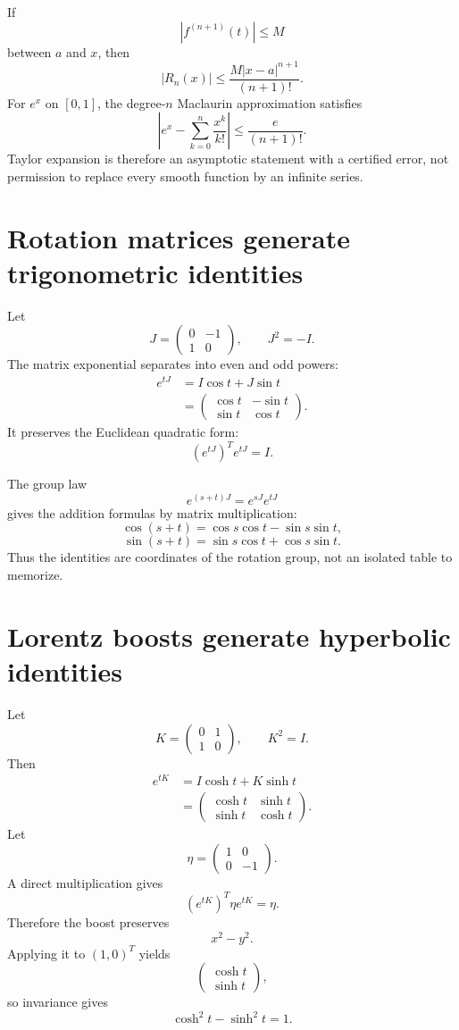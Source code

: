 If
\[
  |f^{(n+1)}(t)|\le M
\]
between \(a\) and \(x\), then
\[
  |R_n(x)|
  \le\frac{M|x-a|^{n+1}}{(n+1)!}.
\]
For \(e^x\) on \([0,1]\), the degree-\(n\) Maclaurin approximation satisfies
\[
  \left|
  e^x-\sum_{k=0}^n\frac{x^k}{k!}
  \right|
  \le\frac{e}{(n+1)!}.
\]
Taylor expansion is therefore an asymptotic statement with a certified error, not permission to replace every smooth function by an infinite series.

\section{Rotation matrices generate trigonometric identities}

Let
\[
  J=
  \begin{pmatrix}
  0&-1\\
  1&0
  \end{pmatrix},
  \qquad
  J^2=-I.
\]
The matrix exponential separates into even and odd powers:
\[
\begin{aligned}
  e^{tJ}
  &=I\cos t+J\sin t\\
  &=
  \begin{pmatrix}
  \cos t&-\sin t\\
  \sin t&\cos t
  \end{pmatrix}.
\end{aligned}
\]
It preserves the Euclidean quadratic form:
\[
  (e^{tJ})^Te^{tJ}=I.
\]

The group law
\[
  e^{(s+t)J}=e^{sJ}e^{tJ}
\]
gives the addition formulas by matrix multiplication:
\[
  \cos(s+t)=\cos s\cos t-\sin s\sin t,
\]
\[
  \sin(s+t)=\sin s\cos t+\cos s\sin t.
\]
Thus the identities are coordinates of the rotation group, not an isolated table to memorize.

\section{Lorentz boosts generate hyperbolic identities}

Let
\[
  K=
  \begin{pmatrix}
  0&1\\
  1&0
  \end{pmatrix},
  \qquad
  K^2=I.
\]
Then
\[
\begin{aligned}
  e^{tK}
  &=I\cosh t+K\sinh t\\
  &=
  \begin{pmatrix}
  \cosh t&\sinh t\\
  \sinh t&\cosh t
  \end{pmatrix}.
\end{aligned}
\]
Let
\[
  \eta=
  \begin{pmatrix}
  1&0\\
  0&-1
  \end{pmatrix}.
\]
A direct multiplication gives
\[
  (e^{tK})^T\eta e^{tK}=\eta.
\]
Therefore the boost preserves
\[
  x^2-y^2.
\]
Applying it to \((1,0)^T\) yields
\[
  \begin{pmatrix}\cosh t\\\sinh t\end{pmatrix},
\]
so invariance gives
\[
  \boxed{\cosh^2t-\sinh^2t=1.}
\]

